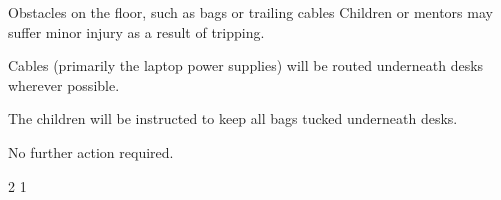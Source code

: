 {    \risk
        {Obstacles on the floor, such as bags or trailing cables}
        {Children or mentors may suffer minor injury as a result of tripping.}
        {\item Cables (primarily the laptop power supplies) will be routed
         underneath desks wherever possible.
         \item The children will be instructed to keep all bags tucked underneath
         desks.}
        {\item No further action required.}
        {2} %
        {1} %
}

\newcommand{\postrisks}{
    \subsection*{Risk of fire}

    To minimise the risk of fire resulting from this activity, food and drink
    will not be allowed near the laptops or robots, and naked flames will be
    prohibited. The risk of fire occurring elsewhere in the building is
    controlled by the building operator\footnote{Estates and Facilities:
    \url{http://www.southampton.ac.uk/estates/}}. The ESO will ensure that all
    people present are informed of the locations of the exits and that no fire
    drills are expected to take place.
}



